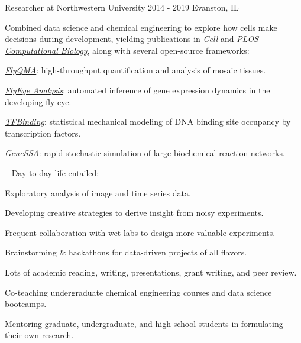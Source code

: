 \begin{cventries}
  \cventrynew
	{Researcher at Northwestern University}    
    {2014 - 2019} 
    {Evanston, IL} 
    {Combined data science and chemical engineering to explore how cells make decisions during development, yielding publications \newline
     in \href{https://doi.org/10.1016/j.cell.2019.06.023}{\emph{Cell}} and \href{https://doi.org/10.1371/journal.pcbi.1007406}{\emph{PLOS Computational Biology}}, along with several open-source frameworks:
     \vspace{4.0mm}
      \begin{cvitems} 
		 \item {\emph{\href{https://pypi.org/project/flyqma/}{FlyQMA}}: high-throughput quantification and analysis of mosaic tissues.}         
         \item {\emph{\href{https://pypi.org/project/flyeye/}{FlyEye Analysis}}: automated inference of gene expression dynamics in the developing fly eye.}
         \item {\emph{\href{https://github.com/sebastianbernasek/binding}{TFBinding}}: statistical mechanical modeling of DNA binding site occupancy by transcription factors.}  
         \item {\emph{\href{https://github.com/sebastianbernasek/genessa}{GeneSSA}}: rapid stochastic simulation of large biochemical reaction networks.}      
      \end{cvitems}  
     \vspace{6.0mm}
    \ \newline 
    Day to day life entailed:
    \vspace{4.0mm}
     \begin{cvitems}
		 \item {Exploratory analysis of image and time series data.}
		 \item {Developing creative strategies to derive insight from noisy experiments.}
		 \item {Frequent collaboration with wet labs to design more valuable experiments.}		 
		 \item {Brainstorming \& hackathons for data-driven projects of all flavors.}
		 \item {Lots of academic reading, writing, presentations, grant writing, and peer review.}
         \item {Co-teaching undergraduate chemical engineering courses and data science bootcamps.}
         \item {Mentoring graduate, undergraduate, and high school students in formulating their own research.}         
      \end{cvitems}
     }
      

\end{cventries}
